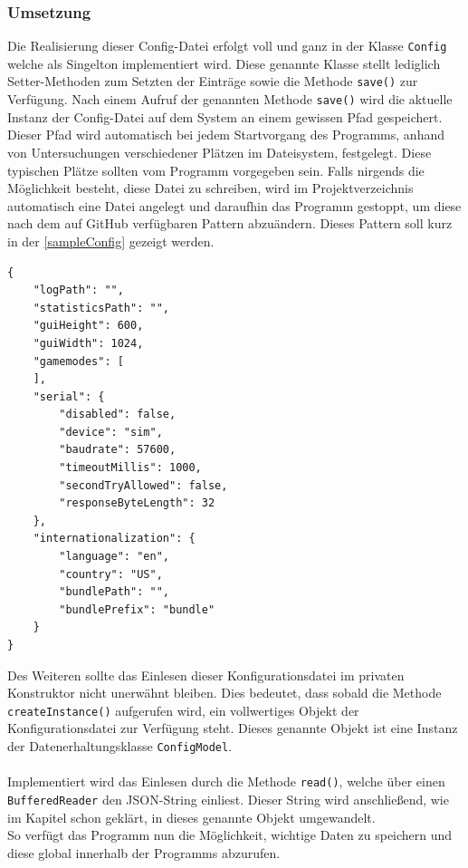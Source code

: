 \subsubsection{Umsetzung}
Die Realisierung dieser Config-Datei erfolgt voll und ganz in der Klasse \lstinline[style=java]{Config} welche als Singelton implementiert wird.
Diese genannte Klasse stellt lediglich Setter-Methoden zum Setzten der Einträge sowie die Methode \lstinline[style=java]{save()} zur Verfügung.
Nach einem Aufruf der genannten Methode \lstinline[style=java]{save()} wird die aktuelle Instanz der Config-Datei auf dem System an einem gewissen Pfad gespeichert.
Dieser Pfad wird automatisch bei jedem Startvorgang des Programms, anhand von Untersuchungen verschiedener Plätzen im Dateisystem, festgelegt.
Diese typischen Plätze sollten vom Programm vorgegeben sein.
Falls nirgends die Möglichkeit besteht, diese Datei zu schreiben, wird im Projektverzeichnis automatisch eine Datei angelegt und daraufhin das Programm gestoppt, um diese nach dem auf GitHub verfügbaren Pattern abzuändern.
Dieses Pattern soll kurz in der \autoref{sampleConfig} gezeigt werden.
\begin{lstlisting}[style=json, caption=JSON-Codebeispiel,label=sampleConfig]
{
    "logPath": "",
    "statisticsPath": "",
    "guiHeight": 600,
    "guiWidth": 1024,
    "gamemodes": [
    ],
    "serial": {
        "disabled": false,
        "device": "sim",
        "baudrate": 57600,
        "timeoutMillis": 1000,
        "secondTryAllowed": false,
        "responseByteLength": 32
    },
    "internationalization": {
        "language": "en",
        "country": "US",
        "bundlePath": "",
        "bundlePrefix": "bundle"
    }
}
\end{lstlisting}
Des Weiteren sollte das Einlesen dieser Konfigurationsdatei im privaten Konstruktor nicht unerwähnt bleiben.
Dies bedeutet, dass sobald die Methode \lstinline[style=java]{createInstance()} aufgerufen wird, ein vollwertiges Objekt der Konfigurationsdatei zur Verfügung steht.
Dieses genannte Objekt ist eine Instanz der Datenerhaltungsklasse \lstinline[style=java]{ConfigModel}.\\\\
Implementiert wird das Einlesen durch die Methode \lstinline[style=java]{read()}, welche über einen \lstinline[style=java]{BufferedReader} den JSON-String einliest.
Dieser String wird anschließend, wie im Kapitel  schon geklärt, in dieses genannte Objekt umgewandelt.\\
So verfügt das Programm nun die Möglichkeit, wichtige Daten zu speichern und diese global innerhalb der Programms abzurufen.
